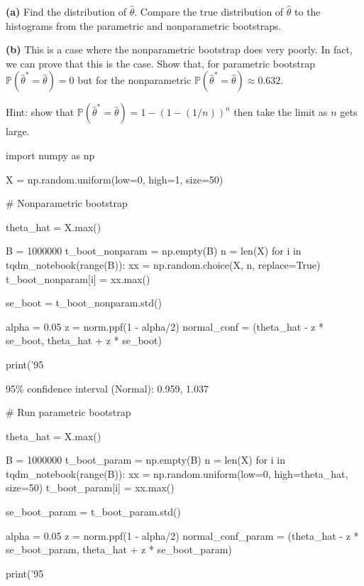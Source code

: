 \textbf{(a)} Find the distribution of \(\hat{\theta}\). Compare the true
distribution of \(\hat{\theta}\) to the histograms from the parametric
and nonparametric bootstraps.

\textbf{(b)} This is a case where the nonparametric bootstrap does very
poorly. In fact, we can prove that this is the case. Show that, for
parametric bootstrap \(\mathbb{P}(\hat{\theta}^* = \hat{\theta}) = 0\)
but for the nonparametric
\(\mathbb{P}(\hat{\theta}^* = \hat{\theta}) \approx 0.632\).

Hint: show that
\(\mathbb{P}(\hat{\theta}^* = \hat{\theta}) = 1 - (1 - (1/n))^{n}\) then
take the limit as \(n\) gets large.

\begin{python}
import numpy as np

X = np.random.uniform(low=0, high=1, size=50)
\end{python}

\begin{python}
# Nonparametric bootstrap

theta_hat = X.max()

B = 1000000
t_boot_{n}onparam = np.empty(B)
n = len(X)
for i in tqdm_{n}otebook(range(B)):
    xx = np.random.choice(X, n, replace=True)
    t_boot_{n}onparam[i] = xx.max()
    
se_boot = t_boot_{n}onparam.std()

alpha = 0.05
z = norm.ppf(1 - alpha/2)
normal_conf = (theta_hat - z * se_boot, theta_hat + z * se_boot)

print('95%
\end{python}

\begin{console}
95\% confidence interval (Normal):        0.959, 1.037
\end{console}

\begin{python}
# Run parametric bootstrap

theta_hat = X.max()

B = 1000000
t_boot_param = np.empty(B)
n = len(X)
for i in tqdm_{n}otebook(range(B)):
    xx = np.random.uniform(low=0, high=theta_hat, size=50)
    t_boot_param[i] = xx.max()
    
se_boot_param = t_boot_param.std()

alpha = 0.05
z = norm.ppf(1 - alpha/2)
normal_conf_param = (theta_hat - z * se_boot_param, theta_hat + z * se_boot_param)

print('95%
\end{python}

